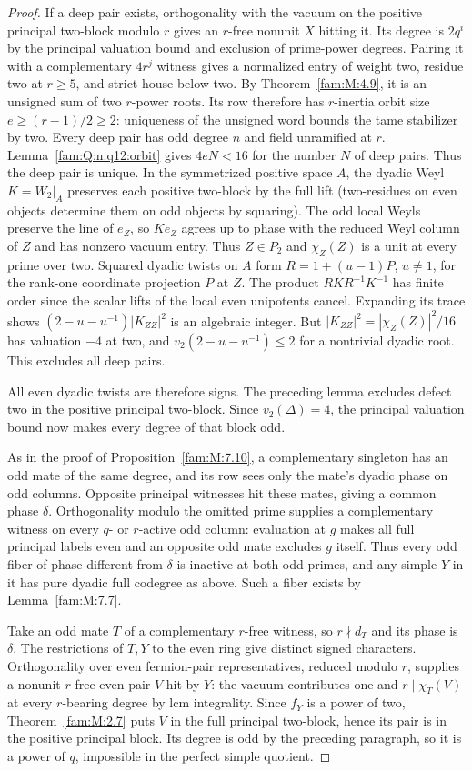 \documentclass[11pt,a4paper]{article}
\numberwithin{equation}{section}
\theoremstyle{remark}
\begin{document}
\begin{proof}
If a deep pair exists, orthogonality with the vacuum on the
positive principal two-block modulo $r$ gives an $r$-free nonunit
$X$ hitting it. Its degree is $2q^i$ by the principal valuation bound
and exclusion of prime-power degrees. Pairing it with a complementary
$4r^j$ witness gives a normalized entry of weight two, residue two
at $r\ge5$, and strict house below two. By Theorem~\ref{fam:M:4.9}, it is
an unsigned sum of two $r$-power roots. Its row therefore has
$r$-inertia orbit size $e\ge(r-1)/2\ge2$: uniqueness of the
unsigned word bounds the tame stabilizer by two. Every deep pair has odd degree $n$ and field unramified at $r$.
Lemma~\ref{fam:Q:n:q12:orbit} gives $4eN<16$ for the number $N$ of deep
pairs.
Thus the deep pair is unique. In the symmetrized positive space
$A$, the dyadic Weyl $K=W_2|_A$ preserves each positive two-block
by the full lift (two-residues on even objects determine them on
odd objects by squaring). The odd local Weyls preserve the line of $e_Z$, so
$Ke_Z$ agrees up to phase with the reduced Weyl column of $Z$ and has nonzero vacuum
entry. Thus $Z\in P_2$ and $\chi_Z(Z)$ is a unit at every prime over two. Squared
dyadic twists on $A$ form $R=1+(u-1)P$, $u\ne1$, for the
rank-one coordinate projection $P$ at $Z$. The product
$RKR^{-1}K^{-1}$ has finite order since the scalar lifts of the
local even unipotents cancel. Expanding its trace shows
$(2-u-u^{-1})|K_{ZZ}|^2$ is an algebraic integer. But
$|K_{ZZ}|^2=|\chi_Z(Z)|^2/16$ has valuation $-4$ at two,
and $v_2(2-u-u^{-1})\le2$ for a nontrivial dyadic root.
This excludes all deep pairs.

All even dyadic twists are therefore signs. The preceding lemma
excludes defect two in the positive principal two-block. Since
$v_2(\Delta)=4$, the principal valuation bound now makes every
degree of that block odd.

As in the proof of Proposition~\ref{fam:M:7.10}, a complementary
singleton has an odd mate of the same degree, and its row sees only the
mate's dyadic phase on odd columns. Opposite principal witnesses hit
these mates, giving a common phase $\delta$. Orthogonality modulo the
omitted prime supplies a complementary witness on every $q$- or
$r$-active odd column: evaluation at $g$ makes all full principal
labels even and an opposite odd mate excludes $g$ itself.
Thus every odd fiber of phase different from $\delta$ is inactive
at both odd primes, and any simple $Y$ in it has pure dyadic full
codegree as above. Such a fiber exists by Lemma~\ref{fam:M:7.7}.

Take an odd mate $T$ of a complementary $r$-free witness,
so $r\nmid d_T$ and its phase is $\delta$. The restrictions of
$T,Y$ to the even ring give distinct signed characters. Orthogonality
over even fermion-pair representatives, reduced modulo $r$, supplies a
nonunit $r$-free even pair $V$ hit by $Y$: the vacuum contributes one
and $r\mid\chi_T(V)$ at every $r$-bearing degree by lcm integrality.
Since $f_Y$ is a power of two, Theorem~\ref{fam:M:2.7} puts $V$ in the
full principal two-block, hence its pair is in the positive
principal block. Its degree is odd by the preceding paragraph,
so it is a power of $q$, impossible in the perfect simple quotient.
\end{proof}
\end{document}
